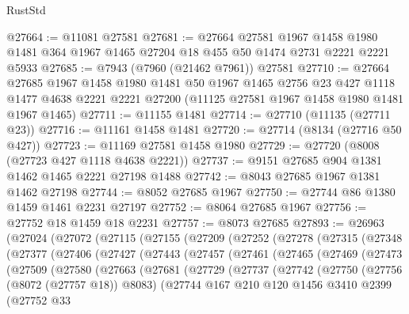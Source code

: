 \begin{lexlean}{RustStd}
\begin{coremodule}
{\begin{coremodule}
{{{{{{{{{{{{{{{{{{{{{{{{{{{{{{{{{{{{{{{{{{{{{{{{{{{{{@27664 := @11081 @27581
@27681 := @27664
    @27581
    @1967
    @1458
    @1980
    @1481
    @364
    @1967
    @1465
    @27204
    @18
    @455
    @50
    @1474
    @2731
    @2221
    @2221
    @5933
@27685 := @7943 (@7960 (@21462 @7961)) @27581
@27710 := @27664
    @27685
    @1967
    @1458
    @1980
    @1481
    @50
    @1967
    @1465
    @2756
    @23
    @427
    @1118
    @1477
    @4638
    @2221
    @2221
    @27200
    (@11125 @27581 @1967 @1458 @1980 @1481 @1967 @1465)
@27711 := @11155 @1481
@27714 := @27710 (@11135 (@27711 @23))
@27716 := @11161 @1458 @1481
@27720 := @27714 (@8134 (@27716 @50 @427))
@27723 := @11169 @27581 @1458 @1980
@27729 := @27720 (@8008 (@27723 @427 @1118 @4638 @2221))
@27737 := @9151 @27685 @904 @1381 @1462 @1465 @2221 @27198 @1488
@27742 := @8043 @27685 @1967 @1381 @1462 @27198
@27744 := @8052 @27685 @1967
@27750 := @27744 @86 @1380 @1459 @1461 @2231 @27197
@27752 := @8064 @27685 @1967
@27756 := @27752 @18 @1459 @18 @2231
@27757 := @8073 @27685
@27893 := @26963
    (@27024
      (@27072
        (@27115
          (@27155
            (@27209
              (@27252
                (@27278
                  (@27315
                    (@27348
                      (@27377
                        (@27406
                          (@27427
                            (@27443
                              (@27457
                                (@27461
                                  (@27465
                                    (@27469
                                      (@27473
                                        (@27509
                                          (@27580
                                            (@27663
                                              (@27681
                                                (@27729
                                                  (@27737
                                                    (@27742
                                                      (@27750
                                                        (@27756 (@8072 (@27757 @18)) @8083)
                                                        (@27744
                                                          @167
                                                          @210
                                                          @120
                                                          @1456
                                                          @3410
                                                          @2399
                                                          (@27752
                                                            @33
}}}}}}}}}}}}}}}}}}}}}}}}}}}}}}}}}}}}}}}}}}}}}}}}}}}}}
\end{coremodule}}
\end{coremodule}
\end{lexlean}
